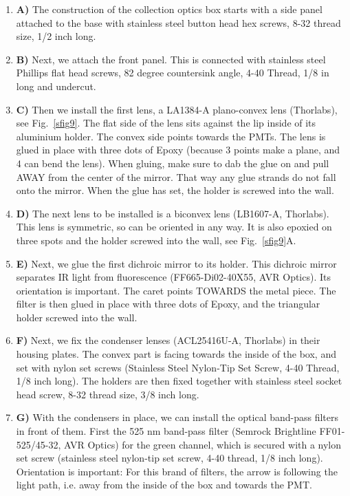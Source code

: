\documentclass[10pt,letterpaper]{article}
\begin{document}
\begin{enumerate}[]
    \item \textbf{A)} The construction of the collection optics box starts with a side panel attached to the base with stainless steel button head hex screws, 8-32 thread size, 1/2 inch long.
    \item \textbf{B)} Next, we attach the front panel. This is connected  with stainless steel Phillips flat head screws, 82 degree countersink angle, 4-40 Thread, 1/8 in long and undercut.
    \item \textbf{C)} Then we install the first lens, a LA1384-A plano-convex lens (Thorlabs), see Fig.~\ref{sfig9}. The flat side of the lens sits against the lip inside of its aluminium holder. The convex side points towards the PMTs. The lens is glued in place with three dots of Epoxy (because 3 points make a plane, and 4 can bend the lens). When gluing, make sure to dab the glue on and pull AWAY from the center of the mirror. That way any glue strands do not fall onto the mirror. When the glue has set, the holder is screwed into the wall. 
    \item \textbf{D)} The next lens to be installed is a biconvex lens (LB1607-A, Thorlabs). This lens is symmetric, so can be oriented in any way. It is also epoxied on three spots and the holder screwed into the wall, see Fig.~\ref{sfig9}A.
    \item \textbf{E)} Next, we glue the first dichroic mirror to its holder. This dichroic mirror separates IR light from fluorescence (FF665-Di02-40X55, AVR Optics). Its orientation is important. The caret points TOWARDS the metal piece. The filter is then glued in place with three dots of Epoxy, and the triangular holder screwed into the wall.
    \item \textbf{F)} Next, we fix the condenser lenses (ACL25416U-A, Thorlabs) in their housing plates. The convex part is facing towards the inside of the box, and set with nylon set screws (Stainless Steel Nylon-Tip Set Screw, 4-40 Thread, 1/8 inch long). The holders are then fixed together with stainless steel socket head screw, 8-32 thread size, 3/8 inch long.
    \item \textbf{G)} With the condensers in place, we can install the optical band-pass filters in front of them. First the 525 nm band-pass filter (Semrock Brightline FF01-525/45-32, AVR Optics) for the green channel, which is secured with a nylon set screw (stainless steel nylon-tip set screw, 4-40 thread, 1/8 inch long). Orientation is important: For this brand of filters, the arrow is following the light path, i.e. away from the inside of the box and towards the PMT.

\end{enumerate}
\end{document}

